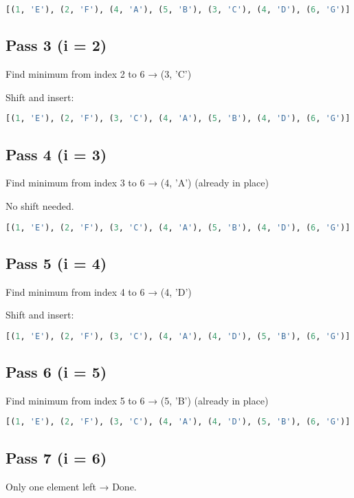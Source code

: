 \documentclass[14pt]{extarticle}
\begin{document}
\begin{lstlisting}[language=Python]
[(1, 'E'), (2, 'F'), (4, 'A'), (5, 'B'), (3, 'C'), (4, 'D'), (6, 'G')]
\end{lstlisting}

\subsection*{Pass 3 (i = 2)}
Find minimum from index 2 to 6 → (3, 'C')

Shift and insert:

\begin{lstlisting}[language=Python]
[(1, 'E'), (2, 'F'), (3, 'C'), (4, 'A'), (5, 'B'), (4, 'D'), (6, 'G')]
\end{lstlisting}

\subsection*{Pass 4 (i = 3)}
Find minimum from index 3 to 6 → (4, 'A') (already in place)

No shift needed.

\begin{lstlisting}[language=Python]
[(1, 'E'), (2, 'F'), (3, 'C'), (4, 'A'), (5, 'B'), (4, 'D'), (6, 'G')]
\end{lstlisting}

\subsection*{Pass 5 (i = 4)}
Find minimum from index 4 to 6 → (4, 'D')

Shift and insert:

\begin{lstlisting}[language=Python]
[(1, 'E'), (2, 'F'), (3, 'C'), (4, 'A'), (4, 'D'), (5, 'B'), (6, 'G')]
\end{lstlisting}

\subsection*{Pass 6 (i = 5)}
Find minimum from index 5 to 6 → (5, 'B') (already in place)

\begin{lstlisting}[language=Python]
[(1, 'E'), (2, 'F'), (3, 'C'), (4, 'A'), (4, 'D'), (5, 'B'), (6, 'G')]
\end{lstlisting}

\subsection*{Pass 7 (i = 6)}
Only one element left → Done.
\end{document}

